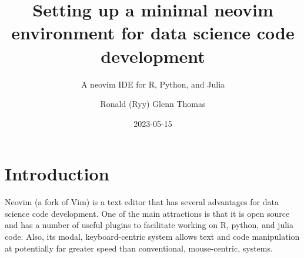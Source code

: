 \documentclass[
  letterpaper,
  DIV=11,
  numbers=noendperiod,
  oneside]{scrartcl}
\title{Setting up a minimal neovim environment for data science code
development}
\subtitle{A neovim IDE for R, Python, and Julia}
\author{Ronald (Ryy) Glenn Thomas}
\date{2023-05-15}
\renewcommand*\contentsname{Table of contents}
\newcommand\contentsname{Table of contents}
\begin{document}
\maketitle
\ifdefined\Shaded\renewenvironment{Shaded}{\begin{tcolorbox}[boxrule=0pt, enhanced, frame hidden, borderline west={3pt}{0pt}{shadecolor}, sharp corners, breakable, interior hidden]}{\end{tcolorbox}}\fi

\renewcommand*\contentsname{Table of contents}
{
\hypersetup{linkcolor=}
\setcounter{tocdepth}{3}
\tableofcontents
}

\hypertarget{introduction}{%
\section{Introduction}\label{introduction}}

Neovim (a fork of Vim) is a text editor that has several advantages for
data science code development. One of the main attractions is that it is
open source and has a number of useful plugins to facilitate working on
R, python, and julia code. Also, its modal, keyboard-centric system
allows text and code manipulation at potentially far greater speed than
conventional, mouse-centric, systems.
\end{document}
